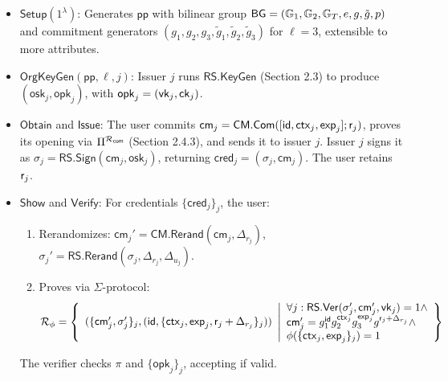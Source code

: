 \begin{itemize}
    \item $\mathsf{Setup}(1^\lambda)$: Generates $\mathsf{pp}$ with bilinear group $\mathsf{BG} = (\mathbb{G}_1, \mathbb{G}_2, \mathbb{G}_T, e, g, \tilde{g}, p)$ and commitment generators $(g_1, g_2, g_3, \tilde{g}_1, \tilde{g}_2, \tilde{g}_3)$ for $\ell = 3$, extensible to more attributes.
    
    \item $\mathsf{OrgKeyGen}(\mathsf{pp}, \ell, j)$: Issuer $j$ runs $\mathsf{RS.KeyGen}$ (Section 2.3) to produce $(\mathsf{osk}_j, \mathsf{opk}_j)$, with $\mathsf{opk}_j = (\mathsf{vk}_j, \mathsf{ck}_j)$.

    \item $\mathsf{Obtain}$ and $\mathsf{Issue}$: The user commits $\mathsf{cm}_j = \mathsf{CM.Com}([\mathsf{id}, \mathsf{ctx}_j, \mathsf{exp}_j]; \mathsf{r}_j)$, proves its opening via $\Pi^{\mathcal{R}_{\mathsf{com}}}$ (Section 2.4.3), and sends it to issuer $j$. Issuer $j$ signs it as $\sigma_j = \mathsf{RS.Sign}(\mathsf{cm}_j, \mathsf{osk}_j)$, returning $\mathsf{cred}_j = (\sigma_j, \mathsf{cm}_j)$. The user retains $\mathsf{r}_j$.

    \item $\mathsf{Show}$ and $\mathsf{Verify}$: For credentials $\{\mathsf{cred}_j\}_j$, the user:
        \begin{enumerate}
            \item Rerandomizes: $\mathsf{cm}_j' = \mathsf{CM.Rerand}(\mathsf{cm}_j, \Delta_{r_j})$, $\sigma_j' = \mathsf{RS.Rerand}(\sigma_j, \Delta_{r_j}, \Delta_{u_j})$.
            \item Proves via $\Sigma$-protocol:
                \[
                \mathcal{R}_\phi =\left\{ 
                \begin{array}{l} 
                (\{\mathsf{cm}_j', \sigma_j'\}_j, (\mathsf{id}, \{\mathsf{ctx}_j, \mathsf{exp}_j, \mathsf{r}_j + \Delta_{r_j}\}_j)) \\
                \end{array} 
                \middle|
                \begin{array}{l}
                \forall j: \mathsf{RS.Ver}(\sigma_j', \mathsf{cm}_j', \mathsf{vk}_j) = 1 \land \\
                \mathsf{cm}_j' = g_1^{\mathsf{id}} g_2^{\mathsf{ctx}_j} g_3^{\mathsf{exp}_j} g^{\mathsf{r}_j + \Delta_{r_j}} \land \\
                \phi(\{\mathsf{ctx}_j, \mathsf{exp}_j\}_j) = 1
                \end{array} 
                \right\}
                \]
        \end{enumerate}
        The verifier checks $\pi$ and $\{\mathsf{opk}_j\}_j$, accepting if valid.
\end{itemize}




